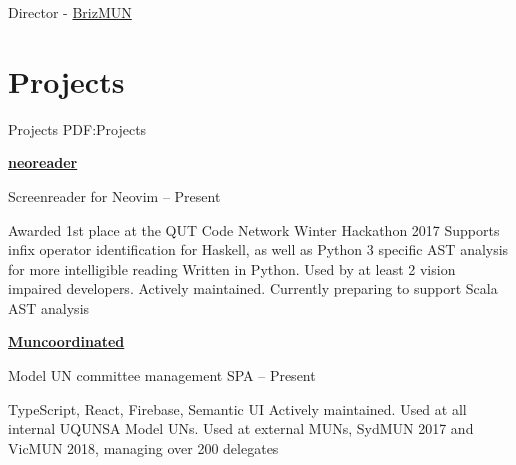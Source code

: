 \documentclass[a4paper,10pt,oneside]{article}
\begin{document}
\begin{body}
\par Director - \href{http://www.brizmun.com/}{BrizMUN} \hfill {}





\section
{Projects}
{Projects}
{PDF:Projects}

\href{https://github.com/MaxwellBo/neoreader}{\textbf{neoreader}} 
\par Screenreader for Neovim\hfill {} -- Present
\begin{detail}
	\BulletItem Awarded 1st place at the QUT Code Network Winter Hackathon 2017
	\BulletItem Supports infix operator identification for Haskell, as well as Python 3 specific AST analysis for more intelligible reading
	\BulletItem Written in Python. Used by at least 2 vision impaired developers. Actively maintained. Currently preparing to support Scala AST analysis
\end{detail}

\EntryGap

\href{https://github.com/MaxwellBo/Muncoordinated-2}{\textbf{Muncoordinated}}
\par Model UN committee management SPA\hfill {} -- Present
\begin{detail}
	\BulletItem TypeScript, React, Firebase, Semantic UI
	\BulletItem Actively maintained. Used at all internal UQUNSA Model UNs. Used at external MUNs, SydMUN 2017 and VicMUN 2018, managing over 200 delegates
\end{detail}


\end{body}
\end{document}
